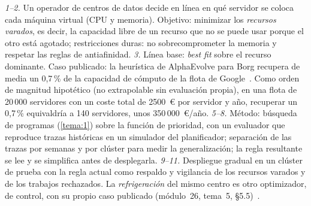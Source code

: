 \begin{ejemplo}\label{ej:mini-cpd}
\emph{1--2.} Un operador de centros de datos decide en línea en qué servidor se coloca cada máquina virtual (CPU y memoria). Objetivo: minimizar los \emph{recursos varados}, es decir, la capacidad libre de un recurso que no se puede usar porque el otro está agotado; restricciones duras: no sobrecomprometer la memoria y respetar las reglas de antiafinidad. \emph{3.} Línea base: \emph{best fit} sobre el recurso dominante. Caso publicado: la heurística de AlphaEvolve para Borg recupera de media un 0{,}7\,\% de la capacidad de cómputo de la flota de Google~\cite{ae-blog}. Como orden de magnitud hipotético (no extrapolable sin evaluación propia), en una flota de 20\,000 servidores con un coste total de 2500~€ por servidor y año, recuperar un 0{,}7\,\% equivaldría a 140 servidores, unos 350\,000~€/año. \emph{5--8.} Método: búsqueda de programas (\cref{tema:1}) sobre la función de prioridad, con un evaluador que reproduce trazas históricas en un simulador del planificador; separación de las trazas por semanas y por clúster para medir la generalización; la regla resultante se lee y se simplifica antes de desplegarla. \emph{9--11.} Despliegue gradual en un clúster de prueba con la regla actual como respaldo y vigilancia de los recursos varados y de los trabajos rechazados. La \emph{refrigeración} del mismo centro es otro optimizador, de control, con su propio caso publicado (módulo~26, tema~5, §5.5)~\cite{deepmind}.
\end{ejemplo}

